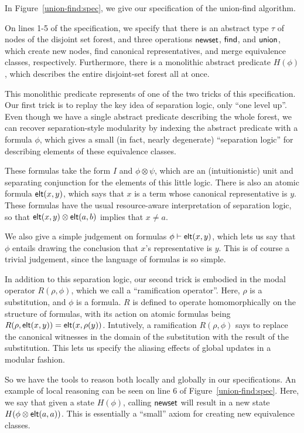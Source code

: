 In Figure~\ref{union-find:spec}, we give our specification of the
union-find algorithm. 

On lines 1-5 of the specification, we specify that there is an
abstract type $\tau$ of nodes of the disjoint set forest, and three
operations $\mathsf{newset}$, $\mathsf{find}$, and $\mathsf{union}$, which create new nodes,
find canonical representatives, and merge equivalence classes,
respectively. Furthermore, there is a monolithic abstract predicate
$H(\phi)$, which describes the entire disjoint-set forest all at once.

This monolithic predicate represents of one of the two tricks of this
specification. Our first trick is to replay the key idea of separation
logic, only ``one level up''. Even though we have a single abstract
predicate describing the whole forest, we can recover separation-style
modularity by indexing the abstract predicate with a formula $\phi$,
which gives a small (in fact, nearly degenerate) ``separation logic''
for describing elements of these equivalence classes.

These formulas take the form $I$ and $\phi \otimes \psi$, which are an
(intuitionistic) unit and separating conjunction for the elements of
this little logic. There is also an atomic formula $\mathsf{elt}({x}, {y})$, which
says that $x$ is a term whose canonical representative is $y$. These
formulas have the usual resource-aware interpretation of separation
logic, so that $\mathsf{elt}({x}, {y}) \otimes \mathsf{elt}({a}, {b})$ implies that $x \not=
a$.  

We also give a simple judgement on formulas ${\phi} \vdash \mathsf{elt}({x}, {y})$,
which lets us say that $\phi$ entails drawing the conclusion that
$x$'s representative is $y$. This is of course a trivial judgement,
since the language of formulas is so simple.

In addition to this separation logic, our second trick is embodied in
the modal operator $R(\rho, \phi)$, which we call a ``ramification
operator''. Here, $\rho$ is a substitution, and $\phi$ is a
formula. $R$ is defined to operate homomorphically on the structure of
formulas, with its action on atomic formulas being $R(\rho,
\mathsf{elt}({x}, {y})) = \mathsf{elt}({x}, {\rho(y)})$. Intutively, a ramification $R(\rho,
\phi)$ says to replace the canonical witnesses in the domain of the
substitution with the result of the substitution. This lets us specify
the aliasing effects of global updates in a modular fashion.

So we have the tools to reason both locally and globally in our
specifications.  An example of local reasoning can be seen on line 6
of Figure~\ref{union-find:spec}.  Here, we say that given a state
$H(\phi)$, calling $\mathsf{newset}$ will result in a new state $H(\phi
\otimes \mathsf{elt}({a}, {a}))$. This is essentially a ``small'' axiom for
creating new equivalence classes. 

